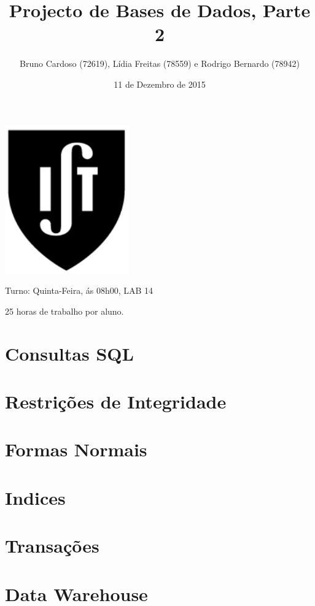 \documentclass[11pt,a4paper]{article}
\title{\textbf{Projecto de Bases de Dados, Parte 2}}
\author{Bruno Cardoso (72619), Lídia Freitas (78559) e Rodrigo Bernardo (78942)
}
\affil{Instituto Superior T\'{e}cnico}
\begin{document}
\date{11 de Dezembro de 2015}

\maketitle

\centerline{\includegraphics[width=0.4\textwidth]{ist-simbolo.jpg}}

\begin{description}[noitemsep]
	\item {}
	\item Turno: Quinta-Feira, ás 08h00, LAB 14
	\item 25 horas de trabalho por aluno.
\end{description}


\newpage

\tableofcontents
\newpage

\section{Consultas SQL}
\newpage
\section{Restrições de Integridade}
\newpage
\section{Formas Normais}\newpage
\newpage
\section{Indices}
\newpage
\section{Transações}
\newpage
\section{Data Warehouse}
\end{document}
